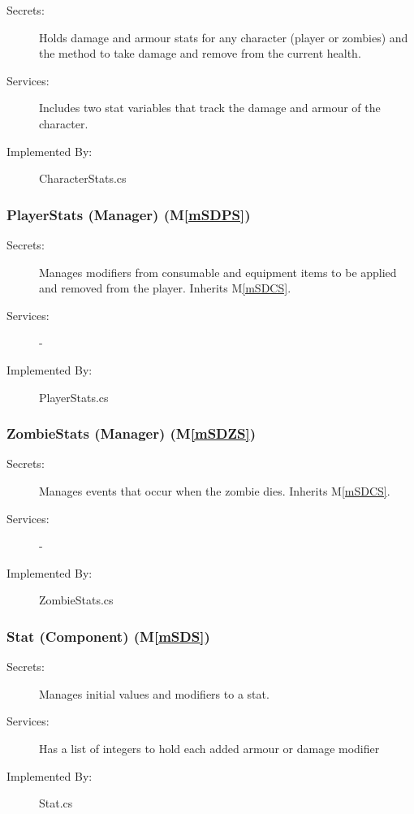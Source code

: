 \documentclass[12pt, titlepage]{article}
\newcommand{\mref}[1]{M\ref{#1}}
\begin{document}
\begin{description}
\item[Secrets:] Holds damage and armour stats for any character (player or zombies) and the method to take damage and remove from the current health.
\item[Services:] Includes two stat variables that track the damage and armour of the character.
\item[Implemented By:] CharacterStats.cs
\end{description}

\subsubsection{PlayerStats (Manager) (\mref{mSDPS})}

\begin{description}
\item[Secrets:] Manages modifiers from consumable and equipment items to be applied and removed from the player. Inherits \mref{mSDCS}.
\item[Services:] -
\item[Implemented By:] PlayerStats.cs
\end{description}

\subsubsection{ZombieStats (Manager) (\mref{mSDZS})}

\begin{description}
\item[Secrets:] Manages events that occur when the zombie dies. Inherits \mref{mSDCS}.
\item[Services:] -
\item[Implemented By:] ZombieStats.cs
\end{description}

\subsubsection{Stat (Component) (\mref{mSDS})}

\begin{description}
\item[Secrets:] Manages initial values and modifiers to a stat.
\item[Services:] Has a list of integers to hold each added armour or damage modifier
\item[Implemented By:] Stat.cs
\end{description}
\end{document}

